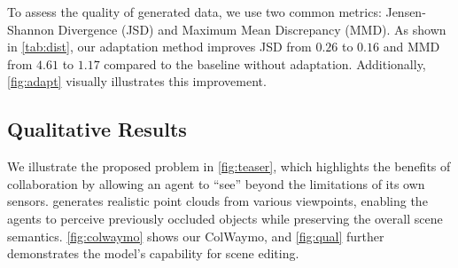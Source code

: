  To assess the quality of generated data, we use two common metrics: Jensen-Shannon Divergence (JSD) and Maximum Mean Discrepancy (MMD). As shown in \cref{tab:dist}, our adaptation method improves JSD from $0.26$ to $0.16$ and MMD from $4.61$ to $1.17$ compared to the baseline without adaptation. Additionally, \cref{fig:adapt} visually illustrates this improvement.

\subsection{Qualitative Results}
We illustrate the proposed problem in \cref{fig:teaser}, which highlights the benefits of collaboration by allowing an agent to ``see'' beyond the limitations of its own sensors. \ours generates realistic point clouds from various viewpoints, enabling the agents to perceive previously occluded objects while preserving the overall scene semantics. \cref{fig:colwaymo} shows our ColWaymo, and \cref{fig:qual} further demonstrates the model’s capability for scene editing.

